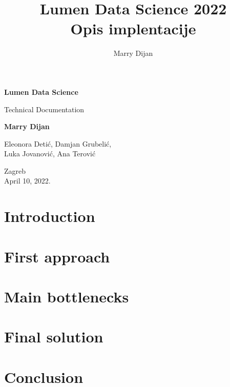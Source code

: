 \documentclass{article}
\title{%
 Lumen Data Science 2022 \\
  \large Opis implentacije}
\author{Marry Dijan}
\begin{document}
\begin{titlepage}
    \begin{center}
        \vspace*{2cm}
       
        \Huge
        \textbf{Lumen Data Science}
            
        \vspace{0.5cm}
        \LARGE
        Technical Documentation
            
        \vspace{1.5cm}
            
        \textbf{Marry Dijan}
            
        \vfill
            
        Eleonora Detić, Damjan Grubelić,\\
        Luka Jovanović, Ana Terović
            
        \vspace{0.8cm}
            
            
        \Large
        Zagreb\\
        April 10, 2022.
            
    \end{center}
\end{titlepage}

\newpage
\tableofcontents
\newpage
\section{Introduction}
\newpage
\section{First approach}
\newpage
\section{Main bottlenecks}
\newpage
\section{Final solution}
\newpage
\section{Conclusion}
\end{document}
